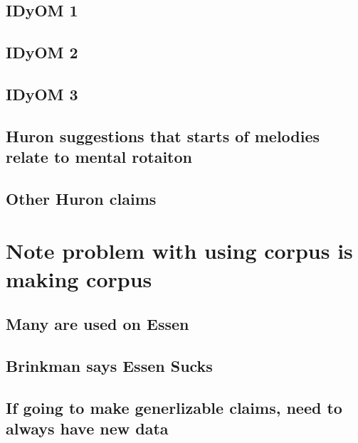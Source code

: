 \documentclass[]{book}
\theoremstyle{definition}
\theoremstyle{definition}
\theoremstyle{definition}
\theoremstyle{remark}
\begin{document}
\hypertarget{idyom-1}{%
\subsection{IDyOM 1}\label{idyom-1}}

\hypertarget{idyom-2}{%
\subsection{IDyOM 2}\label{idyom-2}}

\hypertarget{idyom-3}{%
\subsection{IDyOM 3}\label{idyom-3}}

\hypertarget{huron-suggestions-that-starts-of-melodies-relate-to-mental-rotaiton}{%
\subsection{Huron suggestions that starts of melodies relate to mental
rotaiton}\label{huron-suggestions-that-starts-of-melodies-relate-to-mental-rotaiton}}

\hypertarget{other-huron-claims}{%
\subsection{Other Huron claims}\label{other-huron-claims}}

\hypertarget{note-problem-with-using-corpus-is-making-corpus}{%
\section{Note problem with using corpus is making
corpus}\label{note-problem-with-using-corpus-is-making-corpus}}

\hypertarget{many-are-used-on-essen}{%
\subsection{Many are used on Essen}\label{many-are-used-on-essen}}

\hypertarget{brinkman-says-essen-sucks}{%
\subsection{Brinkman says Essen Sucks}\label{brinkman-says-essen-sucks}}

\hypertarget{if-going-to-make-generlizable-claims-need-to-always-have-new-data}{%
\subsection{If going to make generlizable claims, need to always have
new
data}\label{if-going-to-make-generlizable-claims-need-to-always-have-new-data}}
\end{document}
